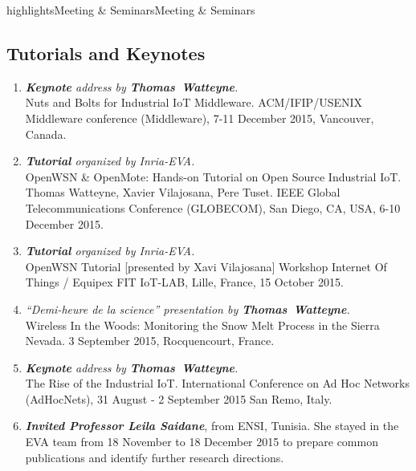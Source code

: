 \documentclass{ra2016}
\newcommand{\thomas}  {\textbf{Thomas~Watteyne}}
\begin{document}
\begin{module}{highlights}{Meeting \& Seminars}{Meeting \& Seminars}
\label{sec:meetingseminars}

\subsection{Tutorials and Keynotes}
\begin{enumerate}
    \item \textit{\textbf{Keynote} address by \thomas.}\\
        Nuts and Bolts for Industrial IoT Middleware. ACM/IFIP/USENIX Middleware conference (Middleware), 7-11 December 2015, Vancouver, Canada.
    \item \textit{\textbf{Tutorial} organized by Inria-EVA.}\\
        OpenWSN \& OpenMote: Hands-on Tutorial on Open Source Industrial IoT. Thomas Watteyne, Xavier Vilajosana, Pere Tuset. IEEE Global Telecommunications Conference (GLOBECOM), San Diego, CA, USA, 6-10 December 2015.
    \item \textit{\textbf{Tutorial} organized by Inria-EVA.}\\
        OpenWSN Tutorial [presented by Xavi Vilajosana] Workshop Internet Of Things / Equipex FIT IoT-LAB, Lille, France, 15 October 2015.
    \item \textit{``Demi-heure de la science'' presentation by \thomas.}\\
        Wireless In the Woods: Monitoring the Snow Melt Process in the Sierra Nevada. 3 September 2015, Rocquencourt, France.
    \item \textit{\textbf{Keynote} address by \thomas.}\\
        The Rise of the Industrial IoT. International Conference on Ad Hoc Networks (AdHocNets), 31 August - 2 September 2015 San Remo, Italy.

    \item \textit{\textbf{Invited Professor Leila Saidane}}, from ENSI, Tunisia. She stayed in the EVA team from 18 November to 18 December 2015 to prepare common publications and identify further research directions.
\end{enumerate}


\end{module}
\end{document}
